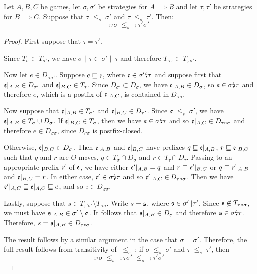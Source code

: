 \documentclass{article}
\newcommand{\stle}{{\;\le_s\;}}
\newcommand{\dv}{{\text{\lightning}}}
\begin{document}
\begin{proposition}
  Let $A,B,C$ be games, let $\sigma,\sigma'$ be strategies for $A\implies B$ and let $\tau,\tau'$ be strategies for $B\implies C$.  Suppose that $\sigma\stle\sigma'$ and $\tau\stle\tau'$.  Then:
  \[
    \comp\tau\sigma\stle\comp{\tau'}{\sigma'}
    \]
  \begin{proof}
    First suppose that $\tau=\tau'$.  

    Since $T_\sigma\subset T_{\sigma'}$, we have $\sigma\|\tau\subset\sigma'\|\tau$ and therefore $T_{\comp\tau\sigma}\subset T_{\comp{\tau}{\sigma'}}$.  

    Now let $e\in D_{\comp{\tau}{\sigma'}}$.  Suppose $e\sqsubseteq\mathfrak e$, where $\e\in\sigma'\dv\tau$ and suppose first that $\mathfrak e\vert_{A,B}\in D_{\sigma'}$ and $\mathfrak e\vert_{B,C}\in T_{\tau}$.  Since $D_{\sigma'}\subset D_\sigma$, we have $\mathfrak e\vert_{A,B}\in D_\sigma$, so $\e\in\sigma\dv\tau$ and therefore $e$, which is a postfix of $\mathfrak e\vert_{A,C}$, is contained in $D_{\comp\tau\sigma}$.  
    
    Now suppose that $\mathfrak e\vert_{A,B}\in T_{\sigma'}$ and $\mathfrak e\vert_{B,C}\in D_{\tau'}$.  Since $\sigma\stle\sigma'$, we have $\mathfrak e\vert_{A,B}\in T_\sigma\cup D_\sigma$.  If $\mathfrak e\vert_{B,C}\in T_\sigma$, then we have $\e\in\sigma\dv\tau$ and so $\mathfrak e\vert_{A,C}\in D_{\tau \circ \sigma}$ and therefore $e\in D_{\comp\tau\sigma}$, since $D_{\comp\tau\sigma}$ is postfix-closed.  

    Otherwise, $\mathfrak e\vert_{B,C}\in D_\sigma$.  Then $\mathfrak e\vert_{A,B}$ and $\mathfrak e\vert_{B,C}$ have prefixes $q\sqsubseteq\mathfrak e\vert_{A,B}$, $r\sqsubseteq\mathfrak e\vert_{B,C}$ such that $q$ and $r$ are $O$-moves, $q\in T_\sigma\cap D_\sigma$ and $r\in T_\tau\cap D_\tau$.  Passing to an appropriate prefix $\mathfrak e'$ of $\mathfrak e$, we have either $\mathfrak e'\vert_{A,B}=q$ and $r\sqsubseteq\mathfrak e'\vert_{B,C}$ or $q\sqsubseteq\mathfrak e'\vert_{A,B}$ and $\mathfrak e\vert_{B,C}=r$.  In either case, $\e'\in \sigma\dv\tau$ and so $\mathfrak e'\vert_{A,C}\in D_{\tau \circ \sigma}$.  Then we have $\mathfrak e'\vert_{A,C}\sqsubseteq\mathfrak e\vert_{A,C}\sqsubseteq e$, and so $e\in D_{\comp\tau\sigma}$.  

    Lastly, suppose that $s\in T_{\comp{\tau'}{\sigma'}}\setminus T_{\comp\tau\sigma}$.  Write $s=\mathfrak s$, where $\mathfrak s\in\sigma'\|\tau'$.  Since $\mathfrak s\not\in T_{\tau \circ \sigma}$, we must have $\mathfrak s\vert_{A,B}\in\sigma'\setminus\sigma$.  It follows that $\mathfrak s\vert_{A,B}\in D_\sigma$ and therefore $\s\in\sigma\dv\tau$.  Therefore, $s=\mathfrak s\vert_{A,B}\in D_{\tau \circ \sigma}$.  

    The result follows by a similar argument in the case that $\sigma=\sigma'$.  Therefore, the full result follows from transitivity of $\stle$: if $\sigma\stle\sigma'$ and $\tau\stle\tau'$, then
    \[
      \comp\tau\sigma \stle \comp\tau{\sigma'} \stle \comp{\tau'}{\sigma'}
      \]
  \end{proof}
\end{proposition}
\end{document}
